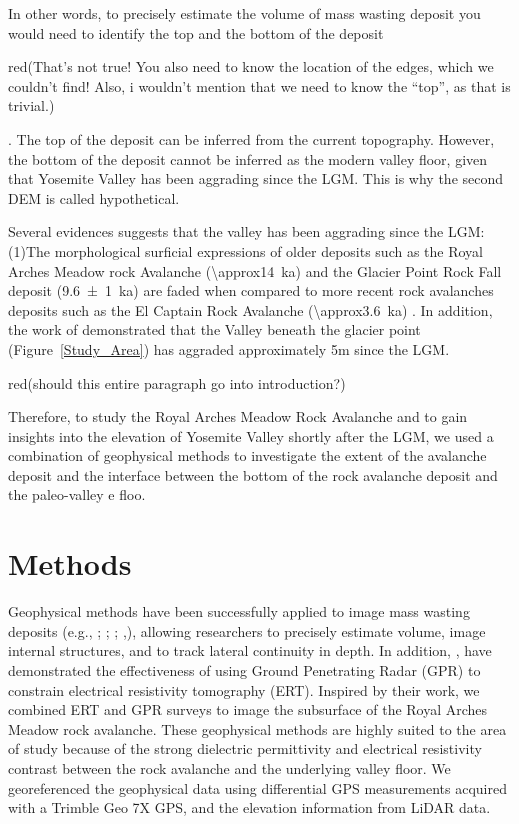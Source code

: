 \documentclass[5p]{elsarticle}
\newcommand{\alon}{\begin{color}{red}}
\newcommand{\aloff}{\end{color}}
\begin{document}
In other words, to precisely estimate the volume of mass wasting deposit you would need to identify the top and the bottom of the deposit \alon(That's not true! You also need to know the location of the edges, which we couldn't find! Also, i wouldn't mention that we need to know the ``top'', as that is trivial.)\aloff. The top of the deposit can be inferred from the current topography. However, the bottom of the deposit cannot be inferred as the modern valley floor, given that Yosemite Valley has been aggrading since the LGM. This is why the second DEM is called hypothetical.


Several evidences suggests that the valley has been aggrading since the LGM: (1)The morphological surficial expressions of older deposits such as the Royal Arches Meadow rock Avalanche (\SI{\approx14}{\kilo a}) and the Glacier Point Rock Fall deposit (\SI{9.6 \pm 1}{\kilo a}) \citep{cordes2013supporting} are faded when compared to more recent rock avalanches deposits such as the El Captain Rock Avalanche (\SI{\approx3.6}{\kilo a}) \citep{stock2010catastrophic}. In addition, the work of \cite{cordes2013supporting} demonstrated that the Valley beneath the glacier point (Figure~\ref{Study_Area}) has aggraded approximately 5m since the LGM. \alon(should this entire paragraph go into introduction?)\aloff

Therefore, to study the Royal Arches Meadow Rock Avalanche and to gain insights into the elevation of Yosemite Valley shortly after the LGM, we used a combination of geophysical methods to investigate the extent of the avalanche deposit and the interface between the bottom of the rock avalanche deposit and the paleo-valley e floo.



\section{Methods}

Geophysical methods have been successfully applied to image mass wasting deposits (e.g., \cite{sass2006determination}; \cite{otto2006comparing}; \cite{socco2010geophysical}; \cite{brody2015near},\cite{liu2018near}), allowing researchers to precisely estimate volume, image internal structures, and to track lateral continuity in depth. In addition, \cite{doetsch2012constraining}, have demonstrated the effectiveness of using Ground Penetrating Radar (GPR) to constrain electrical resistivity tomography (ERT). Inspired by their work, we combined ERT and GPR surveys to image the subsurface of the Royal Arches Meadow rock avalanche. These geophysical methods are highly suited to the area of study because of the strong dielectric permittivity and electrical resistivity contrast between the rock avalanche and the underlying valley floor. We georeferenced the geophysical data using differential GPS measurements acquired with a Trimble Geo 7X GPS, and the elevation information from LiDAR data.
\end{document}
